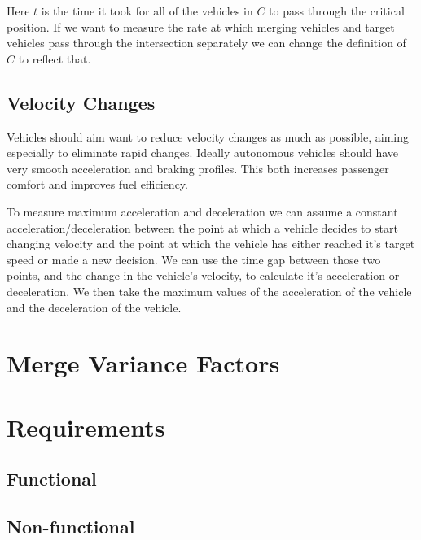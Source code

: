Here $t$ is the time it took for all of the vehicles in $C$ to pass through the critical position. If we want to measure the rate at which merging vehicles and target vehicles pass through the intersection separately we can change the definition of $C$ to reflect that.

\subsection{Velocity Changes}
\label{subsec:Velocity Changes}
Vehicles should aim want to reduce velocity changes as much as possible, aiming especially to eliminate rapid changes. Ideally autonomous vehicles should have very smooth acceleration and braking profiles. This both increases passenger comfort and improves fuel efficiency.

To measure maximum acceleration and deceleration we can assume a constant acceleration/deceleration between the point at which a vehicle decides to start changing velocity and the point at which the vehicle has either reached it's target speed or made a new decision. We can use the time gap between those two points, and the change in the vehicle's velocity, to calculate it's acceleration or deceleration. We then take the maximum values of the acceleration of the vehicle and the deceleration of the vehicle.

\section{Merge Variance Factors}
\label{sec:Merge Variance Factors}

\section{Requirements}
\label{sec:Requirements}

\subsection{Functional}
\label{subsec:Functional}

\subsection{Non-functional}
\label{subsec:Non-functional}